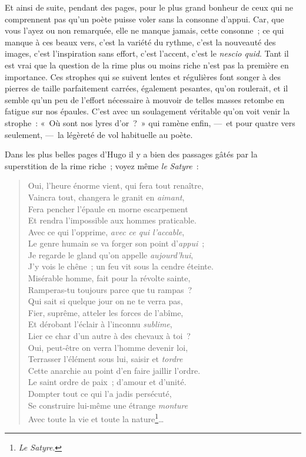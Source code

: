 \documentclass[french,twoside]{book} %
\begin{document}
\noindent Et ainsi de suite, pendant des pages, pour le plus grand bonheur de ceux qui ne comprennent pas qu’un poète puisse voler sans la consonne d’appui. Car, que vous l’ayez ou non remarquée, elle ne manque jamais, cette consonne ; ce qui manque à ces beaux vers, c’est la variété du rythme, c’est la nouveauté des images, c’est l’inspiration sans effort, c’est l’accent, c’est le \emph{nescio quid}. Tant il est vrai que la question de la rime plus ou moins riche n’est pas la première en importance. Ces strophes qui se suivent lentes et régulières font songer à des pierres de taille parfaitement carrées, également pesantes, qu’on roulerait, et il semble qu’un peu de l’effort nécessaire à mouvoir de telles masses retombe en fatigue sur nos épaules. C’est avec un soulagement véritable qu’on voit venir la strophe : « Où sont nos lyres d’or ? » qui ramène enfin, — et pour quatre vers seulement, — la légèreté de vol habituelle au poète.\par
Dans les plus belles pages d’Hugo il y a bien des passages gâtés par la superstition de la rime riche ; voyez même \emph{le} \emph{Satyre} :\par


\begin{verse}
Oui, l’heure énorme vient, qui fera tout renaître,\\
Vaincra tout, changera le granit en \emph{aimant},\\
Fera pencher l’épaule en morne escarpement\\
Et rendra l’impossible aux hommes praticable.\\
Avec ce qui l’opprime, \emph{avec ce qui l’accable},\\
Le genre humain se va forger son point d’\emph{appui} ;\\
Je regarde le gland qu’on appelle \emph{aujourd’hui},\\
J’y vois le chêne ; un feu vit sous la cendre éteinte.\\
Misérable homme, fait pour la révolte sainte,\\
Ramperas-tu toujours parce que tu rampas ?\\
Qui sait si quelque jour on ne te verra pas,\\
Fier, suprême, atteler les forces de l’abîme,\\
Et dérobant l’éclair à l’inconnu \emph{sublime},\\
Lier ce char d’un autre à des chevaux à toi ?\\
Oui, peut-être on verra l’homme devenir loi,\\
Terrasser l’élément sous lui, saisir et \emph{tordre}\\
Cette anarchie au point d’en faire jaillir l’ordre.\\
Le saint ordre de paix ; d’amour et d’unité.\\
Dompter tout ce qui l’a jadis persécuté,\\
Se construire lui-même une étrange \emph{monture}\\
Avec toute la vie et toute la nature\footnote{\emph{Le Satyre}.}…\\
\end{verse}
\end{document}
